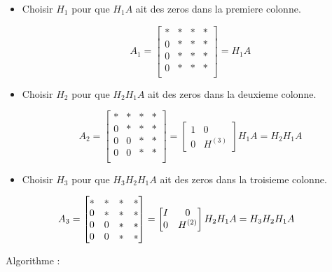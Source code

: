 
\begin{itemize}
    \item Choisir $H_1$ pour que $H_1A$ ait des zeros dans la premiere colonne. 
    
$$
A_1 = \begin{bmatrix}
    * & * & * & * \\
    0& * & * & * \\
    0& * & * & * \\
    0& * & * & * \\
\end{bmatrix} = H_1A
$$
    \item Choisir $H_2$ pour que $H_2H_1A$ ait des zeros dans la deuxieme colonne.

\[
A_2 = \begin{bmatrix}
    * & * & * & * \\
    0& * & * & * \\
    0& 0 & * & * \\
    0& 0 & * & * \\
\end{bmatrix} = 
\begin{bmatrix}
1 & 0 \\
0 & H^{(3)}
\end{bmatrix} 
                H_1 A =H_2H_1A
\]

    \item Choisir $H_3$ pour que $H_3H_2H_1A$ ait des zeros dans la troisieme colonne.

\[
    \hspace{-1cm}
A_3 = \begin{bmatrix}
    * & * & * & * \\
    0& * & * & * \\
    0& 0 & * & * \\
    0& 0 & * & * \\
\end{bmatrix} = 
\begin{bmatrix}
I &  0 \\
0 & H^{(2)}
\end{bmatrix} 
                H_2 H_1 A =H_3 H_2 H_1 A
\]
\end{itemize}

Algorithme :

